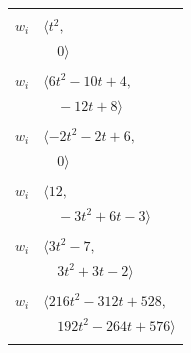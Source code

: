 \documentclass[11pt]{article}
\begin{document}
\begin{longtable}{@{}ll@{}}
\addlinespace[2pt]
\multicolumn{2}{@{}p{0.97\textwidth}@{}}{$i=6$, $D_i=1$, $\rho_{ij}$: $7{:}2, \allowbreak 8{:}1$}\\
$w_i$ & $\langle t^{2},$\\
 & $\quad 0\rangle$\\
\addlinespace[2pt]
\multicolumn{2}{@{}p{0.97\textwidth}@{}}{$i=7$, $D_i=1$, $\rho_{ij}$: $6{:}1, \allowbreak 16{:}2, \allowbreak 19{:}1, \allowbreak 20{:}2, \allowbreak 21{:}2, \allowbreak 23{:}2, \allowbreak 25{:}2, \allowbreak 29{:}1, \allowbreak 34{:}1, \allowbreak 37{:}2, \allowbreak 39{:}1, \allowbreak 46{:}1$}\\
$w_i$ & $\langle 6t^{2}-10t+4,$\\
 & $\quad -12t+8\rangle$\\
\addlinespace[2pt]
\multicolumn{2}{@{}p{0.97\textwidth}@{}}{$i=8$, $D_i=1$, $\rho_{ij}$: $6{:}2, \allowbreak 24{:}1, \allowbreak 30{:}1, \allowbreak 40{:}2, \allowbreak 43{:}2, \allowbreak 44{:}1$}\\
$w_i$ & $\langle -2t^{2}-2t+6,$\\
 & $\quad 0\rangle$\\
\addlinespace[2pt]
\multicolumn{2}{@{}p{0.97\textwidth}@{}}{$i=9$, $D_i=1$, $\rho_{ij}$: $16{:}1, \allowbreak 24{:}2, \allowbreak 30{:}2, \allowbreak 34{:}2, \allowbreak 37{:}2, \allowbreak 42{:}1, \allowbreak 45{:}2$}\\
$w_i$ & $\langle 12,$\\
 & $\quad -3t^{2}+6t-3\rangle$\\
\addlinespace[2pt]
\multicolumn{2}{@{}p{0.97\textwidth}@{}}{$i=10$, $D_i=1$, $\rho_{ij}$: $19{:}1, \allowbreak 21{:}1, \allowbreak 23{:}1, \allowbreak 28{:}1, \allowbreak 30{:}2, \allowbreak 37{:}1, \allowbreak 44{:}1, \allowbreak 45{:}2$}\\
$w_i$ & $\langle 3t^{2}-7,$\\
 & $\quad 3t^{2}+3t-2\rangle$\\
\addlinespace[2pt]
\multicolumn{2}{@{}p{0.97\textwidth}@{}}{$i=11$, $D_i=1$, $\rho_{ij}$: $5{:}1, \allowbreak 18{:}2, \allowbreak 21{:}2, \allowbreak 22{:}2, \allowbreak 27{:}2, \allowbreak 29{:}2, \allowbreak 39{:}2, \allowbreak 40{:}1, \allowbreak 44{:}2, \allowbreak 45{:}1, \allowbreak 46{:}1$}\\
$w_i$ & $\langle 216t^{2}-312t+528,$\\
 & $\quad 192t^{2}-264t+576\rangle$\\
\addlinespace[2pt]
\multicolumn{2}{@{}p{0.97\textwidth}@{}}{$i=12$, $D_i=1$, $\rho_{ij}$: $19{:}2, \allowbreak 33{:}2, \allowbreak 36{:}2, \allowbreak 42{:}1, \allowbreak 43{:}1$}\\

\end{longtable}
\end{document}
